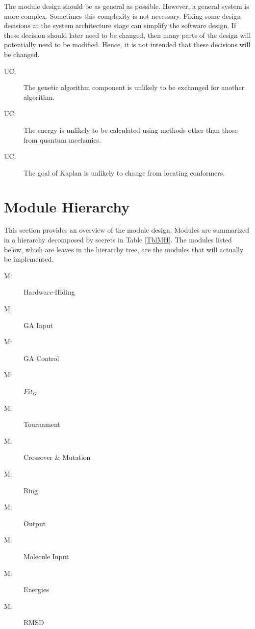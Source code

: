 \documentclass[12pt, titlepage]{article}
\newcounter{ucnum}
\newcommand{\uctheucnum}{UC\theucnum}
\newcounter{mnum}
\newcommand{\mthemnum}{M\themnum}
\newcommand{\progname}{Kaplan} %
\begin{document}
The module design should be as general as possible. However, a general system is
more complex. Sometimes this complexity is not necessary. Fixing some design
decisions at the system architecture stage can simplify the software design. If
these decision should later need to be changed, then many parts of the design
will potentially need to be modified. Hence, it is not intended that these
decisions will be changed.

\begin{description}
\item[ \uctheucnum \label{ucGA}:] The genetic algorithm 
component is unlikely to be exchanged for another algorithm.
\item[ \uctheucnum \label{ucEnery}:] The energy is 
unlikely to be calculated using methods other than those from quantum mechanics.
\item[ \uctheucnum \label{ucgoal}:] The goal of 
\progname{} is unlikely to change from locating conformers.
\end{description}

\section{Module Hierarchy} \label{SecMH}

This section provides an overview of the module design. Modules are summarized
in a hierarchy decomposed by secrets in Table \ref{TblMH}. The modules listed
below, which are leaves in the hierarchy tree, are the modules that will
actually be implemented.

\begin{description}
\item [ \mthemnum \label{mHH}:] Hardware-Hiding
\item [ \mthemnum \label{mGAIn}:] GA Input
\item [ \mthemnum \label{mGAC}:] GA Control
\item [ \mthemnum \label{mFitg}:] $Fit_G$
\item [ \mthemnum \label{mTour}:] Tournament
\item [ \mthemnum \label{mCM}:] Crossover \& Mutation
\item [ \mthemnum \label{mRing}:] Ring
\item [ \mthemnum \label{mOut}:] Output
\item [ \mthemnum \label{mMolIn}:] Molecule Input
\item [ \mthemnum \label{mE}:] Energies
\item [ \mthemnum \label{mRMSD}:] RMSD
\end{description}
\end{document}
